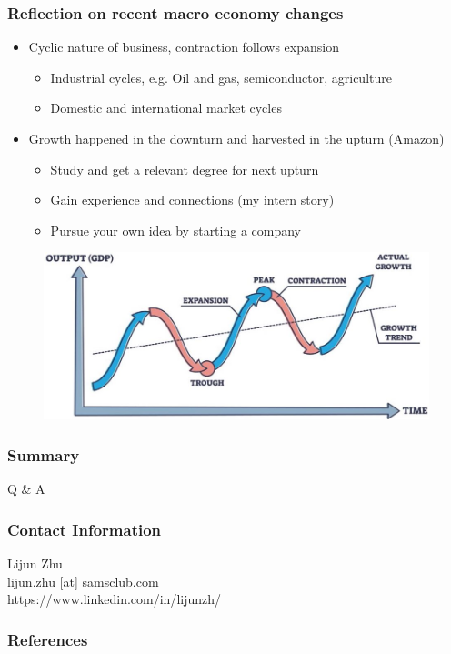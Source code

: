 \documentclass[aspectratio=169,xcolor=x11names,table]{beamer}
\begin{document}
\begin{frame}
	\frametitle{Reflection on recent macro economy changes}
	\begin{itemize}
		\item Cyclic nature of business, contraction follows expansion
			\begin{itemize}
				\item Industrial cycles, e.g. Oil and gas, semiconductor, agriculture
				\item Domestic and international market cycles
			\end{itemize}
		\item Growth happened in the downturn and harvested in the upturn (Amazon)
			\begin{itemize}
				\item Study and get a relevant degree for next upturn
				\item Gain experience and connections (my intern story)
				\item Pursue your own idea by starting a company
			\end{itemize}
	\end{itemize}
	\vfill
	\begin{figure}
		\centering
		\includegraphics[width=0.6\linewidth]{business_cycles}
	\end{figure}
\end{frame}


\begin{frame}
	\frametitle{Summary}
	\tableofcontents
\end{frame}

\begin{frame}
	\center
	\Huge Q \& A
\end{frame}


\begin{frame}
	\frametitle{Contact Information}
	{
		\centering
		\Large
		Lijun Zhu \\
		lijun.zhu [at] samsclub.com \\
		https://www.linkedin.com/in/lijunzh/ \\
	}
\end{frame}


\begin{frame}[t,allowframebreaks]
	\frametitle{References}
	\tiny
	\printbibliography
\end{frame}
\end{document}
